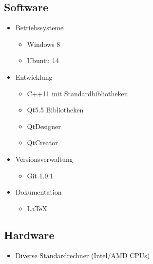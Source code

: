 \subsection{Software}
\begin{itemize}
\item Betriebssysteme
	\begin{itemize}[label={--}]
		\item Windows 8
		\item Ubuntu 14
	\end{itemize}
\item Entwicklung
	\begin{itemize}[label={--}]
		\item C++11 mit Standardbibliotheken
		\item Qt5.5 Bibliotheken
		\item QtDesigner
		\item QtCreator
	\end{itemize}
\item Versionsverwaltung
	\begin{itemize}[label={--}]
		\item Git 1.9.1
	\end{itemize}
\item Dokumentation
	\begin{itemize}[label={--}]
		\item LaTeX
	\end{itemize}
\end{itemize}

\subsection{Hardware}
\begin{itemize}
	\item Diverse Standardrechner (Intel/AMD CPUs)
\end{itemize}
